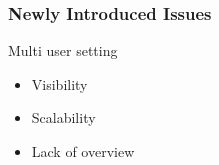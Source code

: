 {
\begin{frame}
\frametitle{Newly Introduced Issues}
	\begin{block}{Multi user setting}
		\begin{itemize}
			\item Visibility
			\item Scalability
			\item Lack of overview
		\end{itemize}
	\end{block}
\end{frame}
}


